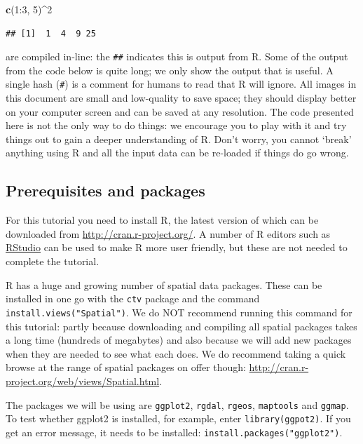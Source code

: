 \documentclass[]{article}
\newenvironment{Shaded}{}{}
\newcommand{\KeywordTok}[1]{\textcolor[rgb]{0.00,0.44,0.13}{\textbf{{#1}}}}
\newcommand{\DecValTok}[1]{\textcolor[rgb]{0.25,0.63,0.44}{{#1}}}
\newcommand{\NormalTok}[1]{{#1}}
\begin{document}
\begin{Shaded}
\begin{Highlighting}[]
\KeywordTok{c}\NormalTok{(}\DecValTok{1}\NormalTok{:}\DecValTok{3}\NormalTok{, }\DecValTok{5}\NormalTok{)^}\DecValTok{2}
\end{Highlighting}
\end{Shaded}
\begin{verbatim}
## [1]  1  4  9 25
\end{verbatim}
are compiled in-line: the \texttt{\#\#} indicates this is output from R.
Some of the output from the code below is quite long; we only show the
output that is useful. A single hash (\texttt{\#}) is a comment for
humans to read that R will ignore. All images in this document are small
and low-quality to save space; they should display better on your
computer screen and can be saved at any resolution. The code presented
here is not the only way to do things: we encourage you to play with it
and try things out to gain a deeper understanding of R. Don't worry, you
cannot `break' anything using R and all the input data can be re-loaded
if things do go wrong.

\subsection{Prerequisites and packages}

For this tutorial you need to install R, the latest version of which can
be downloaded from
\href{http://cran.r-project.org/}{http://cran.r-project.org/}. A number
of R editors such as \href{http://www.rstudio.com/}{RStudio} can be used
to make R more user friendly, but these are not needed to complete the
tutorial.

R has a huge and growing number of spatial data packages. These can be
installed in one go with the \texttt{ctv} package and the command
\texttt{install.views("Spatial")}. We do NOT recommend running this
command for this tutorial: partly because downloading and compiling all
spatial packages takes a long time (hundreds of megabytes) and also
because we will add new packages when they are needed to see what each
does. We do recommend taking a quick browse at the range of spatial
packages on offer though:
\href{http://cran.r-project.org/web/views/Spatial.html}{http://cran.r-project.org/web/views/Spatial.html}.

The packages we will be using are \texttt{ggplot2}, \texttt{rgdal},
\texttt{rgeos}, \texttt{maptools} and \texttt{ggmap}. To test whether
ggplot2 is installed, for example, enter \texttt{library(ggpot2)}. If
you get an error message, it needs to be installed:
\texttt{install.packages("ggplot2")}.
\end{document}
